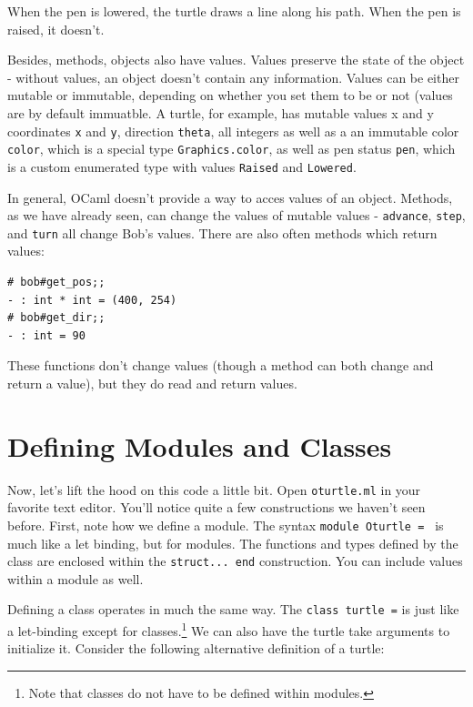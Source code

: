 \documentclass[10pt]{book}
\begin{document}
When the pen is lowered, the turtle draws a line along his path. When the pen is raised, it doesn't.

Besides, methods, objects also have values. Values preserve the state of the object - without values, an object doesn't contain any information. Values can be either mutable or immutable, depending on whether you set them to be or not (values are by default immuatble. A turtle, for example, has mutable values x and y coordinates {\tt x} and {\tt y}, direction {\tt theta}, all integers as well as a an immutable color {\tt color}, which is a special type {\tt Graphics.color}, as well as pen status {\tt pen}, which is a custom enumerated type with values {\tt Raised} and {\tt Lowered}.

In general, OCaml doesn't provide a way to acces values of an object. Methods, as we have already seen, can change the values of mutable values - {\tt advance}, {\tt step}, and {\tt turn} all change Bob's values. There are also often methods which return values:

\beforeverb
\begin{verbatim}
# bob#get_pos;;
- : int * int = (400, 254)
# bob#get_dir;;
- : int = 90
\end{verbatim}
\afterverb

These functions don't change values (though a method can both change and return a value), but they do read and return values.

\begin{ex}
\end{ex}

\section{Defining Modules and Classes}

Now, let's lift the hood on this code a little bit. Open {\tt oturtle.ml} in your favorite text editor. You'll notice quite a few constructions we haven't seen before. First, note how we define a module. The syntax {\tt module Oturtle = } is much like a let binding, but for modules. The functions and types defined by the class are enclosed within the {\tt struct... end} construction. You can include values within a module as well.

Defining a class operates in much the same way. The {\tt class turtle =} is just like a let-binding except for classes.\footnote{Note that classes do not have to be defined within modules.} We can also have the turtle take arguments to initialize it. Consider the following alternative definition of a turtle:
\end{document}
